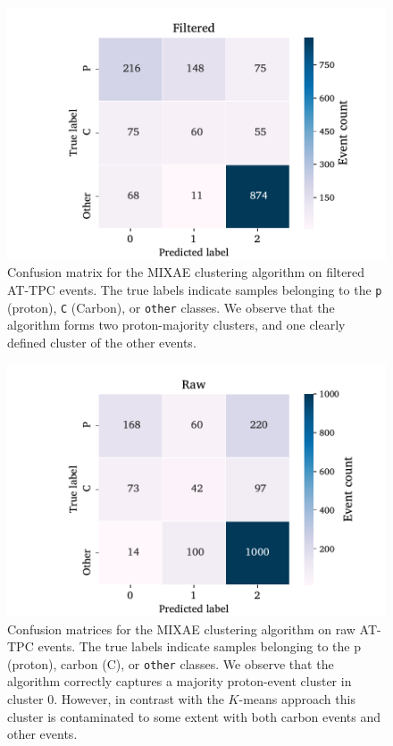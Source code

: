 \documentclass[review,sort&compress]{elsarticle}
\begin{document}
\begin{figure}
\centering
	\includegraphics[width=\textwidth]{custom_work/Filtered_mixae_conf_mat.pdf}
\caption[MIXAE - confusion matrices]{Confusion matrix for the MIXAE clustering algorithm on filtered AT-TPC events. The true labels indicate samples belonging to the \texttt{p} (proton), \texttt{C} (Carbon), or \texttt{other} classes. We observe that the algorithm forms two proton-majority clusters, and one clearly defined cluster of the other events. }\label{fig:mixae_confmat_filtered}
\end{figure}

\begin{figure}
\centering
	\includegraphics[width=\textwidth]{custom_work/Raw_mixae_conf_mat.pdf}
\caption[MIXAE - confusion matrices]{Confusion matrices for the MIXAE clustering algorithm on raw AT-TPC events. The true labels indicate samples belonging to the p (proton), carbon (C), or \texttt{other} classes. We observe that the algorithm correctly captures a majority proton-event cluster in cluster 0. However, in contrast with the $K$-means approach this cluster is contaminated to some extent with both carbon events and other events. }\label{fig:mixae_confmat_raw}
\end{figure}



\end{document}
